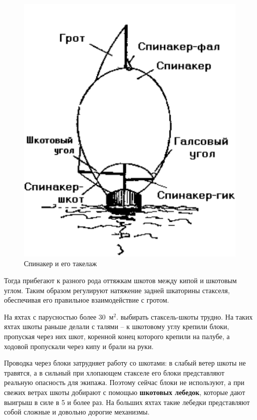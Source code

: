 \documentclass[a4paper, 12pt, twoside, final]{scrbook}
\begin{document}
\begin{figure}%
\begin{centering}
\includegraphics{pics/Spinaker_i_ego_takelazh}
\par\end{centering}

\caption{\label{fig:47}Спинакер и его такелаж}

\end{figure}%


Тогда прибегают к разного рода оттяжкам шкотов между кипой и шкотовым
углом. Таким образом регулируют натяжение задней шкаторины стакселя,
обеспечивая его правильное взаимодействие с гротом.

На яхтах с парусностью более 30~м$^2$. выбирать стаксель-шкоты
трудно. На таких яхтах шкоты раньше делали с талями \--- к шкотовому
углу крепили блоки, пропуская через них шкот, коренной конец которого
крепили на палубе, а ходовой пропускали через кипу и брали на руки.

Проводка через блоки затрудняет работу со шкотами: в слабый ветер
шкоты не травятся, а в сильный при хлопающем стакселе его блоки представляют
реальную опасность для экипажа. Поэтому сейчас блоки не используют,
а при свежих ветрах шкоты добирают с помощью \textbf{шкотовых лебедок},
которые дают выигрыш в силе в 5 и более раз. На больших яхтах такие
лебедки представляют собой сложные и довольно дорогие механизмы.
\end{document}
